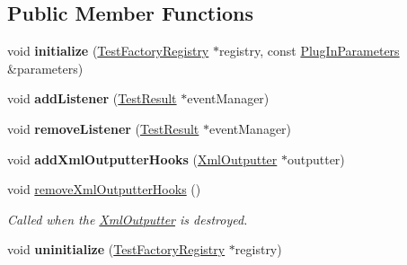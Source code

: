 \subsection*{Public Member Functions}
\begin{DoxyCompactItemize}
\item 
void {\bfseries initialize} (\hyperlink{class_test_factory_registry}{Test\+Factory\+Registry} $\ast$registry, const \hyperlink{class_plug_in_parameters}{Plug\+In\+Parameters} \&parameters)\hypertarget{class_test_plug_in_default_impl_a37c0b83c0a94ef97113b35ae70316883}{}\label{class_test_plug_in_default_impl_a37c0b83c0a94ef97113b35ae70316883}

\item 
void {\bfseries add\+Listener} (\hyperlink{class_test_result}{Test\+Result} $\ast$event\+Manager)\hypertarget{class_test_plug_in_default_impl_a0180a801dd78be5741a200e866684b20}{}\label{class_test_plug_in_default_impl_a0180a801dd78be5741a200e866684b20}

\item 
void {\bfseries remove\+Listener} (\hyperlink{class_test_result}{Test\+Result} $\ast$event\+Manager)\hypertarget{class_test_plug_in_default_impl_a26364a3a81e48ff9adcef1a5cd3e40df}{}\label{class_test_plug_in_default_impl_a26364a3a81e48ff9adcef1a5cd3e40df}

\item 
void {\bfseries add\+Xml\+Outputter\+Hooks} (\hyperlink{class_xml_outputter}{Xml\+Outputter} $\ast$outputter)\hypertarget{class_test_plug_in_default_impl_aed4c5b89adaa0bb0b4f11cc4aca782a2}{}\label{class_test_plug_in_default_impl_aed4c5b89adaa0bb0b4f11cc4aca782a2}

\item 
void \hyperlink{class_test_plug_in_default_impl_aa4fa891e799ff362dece734417afd93d}{remove\+Xml\+Outputter\+Hooks} ()
\begin{DoxyCompactList}\small\item\em Called when the \hyperlink{class_xml_outputter}{Xml\+Outputter} is destroyed. \end{DoxyCompactList}\item 
void {\bfseries uninitialize} (\hyperlink{class_test_factory_registry}{Test\+Factory\+Registry} $\ast$registry)\hypertarget{class_test_plug_in_default_impl_aab567f339bbda38e759b7bd631ad8b8c}{}\label{class_test_plug_in_default_impl_aab567f339bbda38e759b7bd631ad8b8c}

\end{DoxyCompactItemize}



